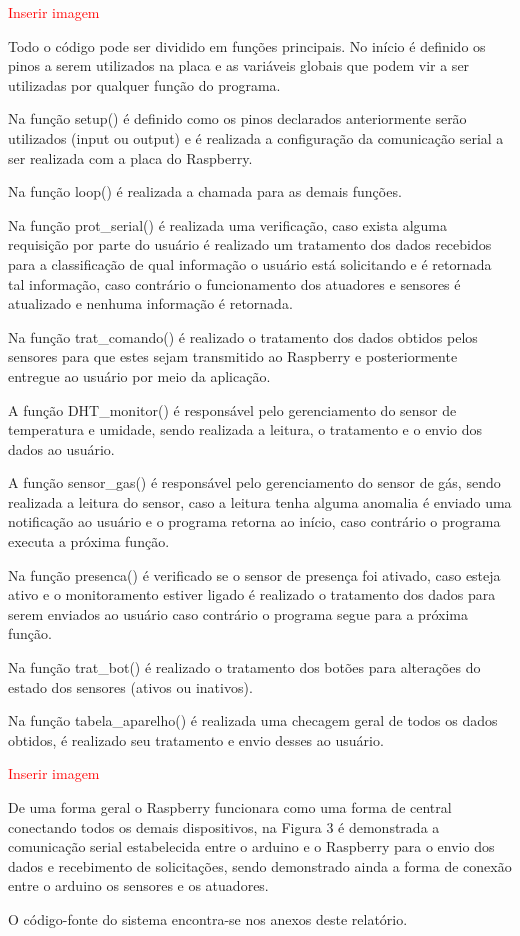 \textcolor{red}{Inserir imagem}

\par Todo o código pode ser dividido em funções principais. No início é definido os pinos a serem utilizados na placa e as variáveis globais que podem vir a ser utilizadas por qualquer função do programa.
\par Na função setup() é definido como os pinos declarados anteriormente serão utilizados (input ou output) e é realizada a configuração da comunicação serial a ser realizada com a placa do Raspberry.
\par Na função loop() é realizada a chamada para as demais funções.
\par Na função prot_serial() é realizada uma verificação, caso exista alguma requisição por parte do usuário é realizado um tratamento dos dados recebidos para a classificação de qual informação o usuário está solicitando e é retornada tal informação, caso contrário o funcionamento dos atuadores e sensores é atualizado e nenhuma informação é retornada.
\par Na função trat_comando() é realizado o tratamento dos dados obtidos pelos sensores para que estes sejam transmitido ao Raspberry e posteriormente entregue ao usuário por meio da aplicação.
\par A função DHT_monitor() é responsável pelo gerenciamento do sensor de temperatura e umidade, sendo realizada a leitura, o tratamento e o envio dos dados ao usuário.
\par A função sensor_gas() é responsável pelo gerenciamento do sensor de gás, sendo realizada a leitura do sensor, caso a leitura tenha alguma anomalia é enviado uma notificação ao usuário e o programa retorna ao início, caso contrário o programa executa a próxima função.
\par Na função presenca() é verificado se o sensor de presença foi ativado, caso esteja ativo e o monitoramento estiver ligado é realizado o tratamento dos dados para serem enviados ao usuário caso contrário o programa segue para a próxima função.
\par Na função trat_bot() é realizado o tratamento dos botões para alterações do estado dos sensores (ativos ou inativos).
\par Na função tabela_aparelho() é realizada uma checagem geral de todos os dados obtidos, é realizado seu tratamento e envio desses ao usuário.

\textcolor{red}{Inserir imagem}

\par De uma forma geral o Raspberry funcionara como uma forma de central conectando todos os demais dispositivos, na Figura 3 é demonstrada a comunicação serial estabelecida entre o arduino e o Raspberry para o envio dos dados e recebimento de solicitações, sendo demonstrado ainda a forma de conexão entre o arduino os sensores e os atuadores.
\par O código-fonte do sistema encontra-se nos anexos deste relatório.
